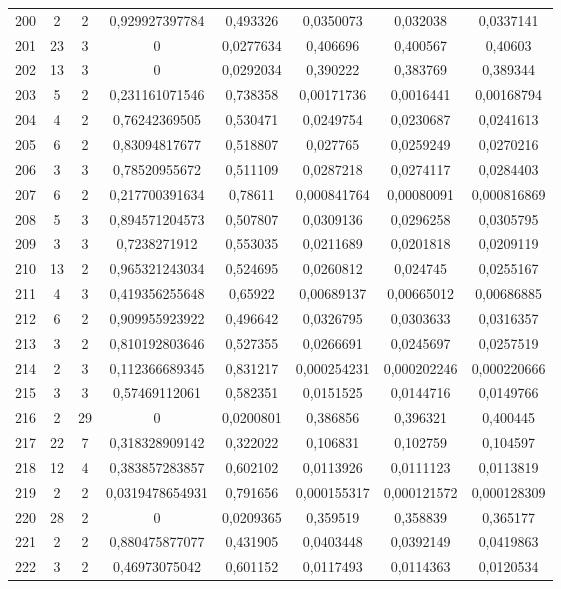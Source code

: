 \begin{longtable}{|c|c|c|c|c|c|c|c|}
200 & 2 & 2 & 0,929927397784 & 0,493326 & 0,0350073 & 0,032038 & 0,0337141  \\
201 & 23 & 3 & 0 & 0,0277634 & 0,406696 & 0,400567 & 0,40603  \\
202 & 13 & 3 & 0 & 0,0292034 & 0,390222 & 0,383769 & 0,389344  \\
203 & 5 & 2 & 0,231161071546 & 0,738358 & 0,00171736 & 0,0016441 & 0,00168794  \\
204 & 4 & 2 & 0,76242369505 & 0,530471 & 0,0249754 & 0,0230687 & 0,0241613  \\
205 & 6 & 2 & 0,83094817677 & 0,518807 & 0,027765 & 0,0259249 & 0,0270216  \\
206 & 3 & 3 & 0,78520955672 & 0,511109 & 0,0287218 & 0,0274117 & 0,0284403  \\
207 & 6 & 2 & 0,217700391634 & 0,78611 & 0,000841764 & 0,00080091 & 0,000816869  \\
208 & 5 & 3 & 0,894571204573 & 0,507807 & 0,0309136 & 0,0296258 & 0,0305795  \\
209 & 3 & 3 & 0,7238271912 & 0,553035 & 0,0211689 & 0,0201818 & 0,0209119  \\
210 & 13 & 2 & 0,965321243034 & 0,524695 & 0,0260812 & 0,024745 & 0,0255167  \\
211 & 4 & 3 & 0,419356255648 & 0,65922 & 0,00689137 & 0,00665012 & 0,00686885  \\
212 & 6 & 2 & 0,909955923922 & 0,496642 & 0,0326795 & 0,0303633 & 0,0316357  \\
213 & 3 & 2 & 0,810192803646 & 0,527355 & 0,0266691 & 0,0245697 & 0,0257519  \\
214 & 2 & 3 & 0,112366689345 & 0,831217 & 0,000254231 & 0,000202246 & 0,000220666  \\
215 & 3 & 3 & 0,57469112061 & 0,582351 & 0,0151525 & 0,0144716 & 0,0149766  \\
216 & 2 & 29 & 0 & 0,0200801 & 0,386856 & 0,396321 & 0,400445  \\
217 & 22 & 7 & 0,318328909142 & 0,322022 & 0,106831 & 0,102759 & 0,104597  \\
218 & 12 & 4 & 0,383857283857 & 0,602102 & 0,0113926 & 0,0111123 & 0,0113819  \\
219 & 2 & 2 & 0,0319478654931 & 0,791656 & 0,000155317 & 0,000121572 & 0,000128309  \\
220 & 28 & 2 & 0 & 0,0209365 & 0,359519 & 0,358839 & 0,365177  \\
221 & 2 & 2 & 0,880475877077 & 0,431905 & 0,0403448 & 0,0392149 & 0,0419863  \\
222 & 3 & 2 & 0,46973075042 & 0,601152 & 0,0117493 & 0,0114363 & 0,0120534  \\

\end{longtable}
